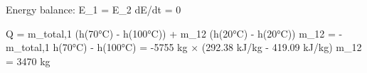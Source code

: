 Energy balance:  
E_1 = E_2  
dE/dt = 0  

Q = m_total,1 (h(70°C) - h(100°C)) + m_12 (h(20°C) - h(20°C))  
m_12 = -m_total,1  
h(70°C) - h(100°C) = -5755 kg × (292.38 kJ/kg - 419.09 kJ/kg)  
m_12 = 3470 kg